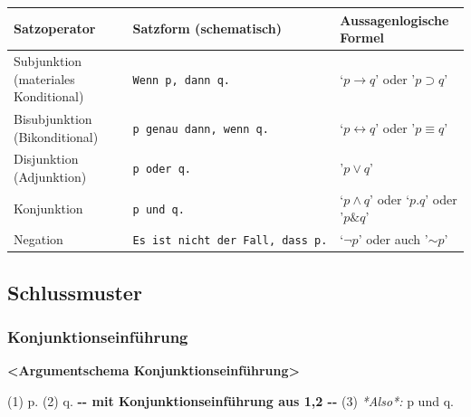 \documentclass[
  english,
  a4paper,
]{article}
\newenvironment{Shaded}{\begin{snugshade}}{\end{snugshade}}
\newcommand{\AlertTok}[1]{\textcolor[rgb]{0.02,0.51,0.79}{\textbf{#1}}}
\newcommand{\ErrorTok}[1]{\textcolor[rgb]{0.02,0.51,0.79}{#1}}
\newcommand{\FloatTok}[1]{\textcolor[rgb]{0.12,0.11,0.11}{\textit{#1}}}
\newcommand{\NormalTok}[1]{\textcolor[rgb]{0.12,0.11,0.11}{#1}}
\newcommand{\WarningTok}[1]{\textcolor[rgb]{0.46,0.73,0.89}{\textbf{#1}}}
\newcounter{none} %
\renewenvironment{Shaded}{\centering \begin{mdframed}[style=codedefault]}{\end{mdframed}}%
\newenvironment{Shaded}{\centering \begin{mdframed}[style=codedefault]}{\end{mdframed}}%
\begin{document}
{\def\LTcaptype{none} %
\begin{longtable}[]{@{}
  >{\raggedright\arraybackslash}p{}
  >{\raggedright\arraybackslash}p{}
  >{\raggedright\arraybackslash}p{}@{}}
\toprule\noalign{}
\begin{minipage}[b]{\linewidth}\raggedright
Satzoperator
\end{minipage} & \begin{minipage}[b]{\linewidth}\raggedright
Satzform (schematisch)
\end{minipage} & \begin{minipage}[b]{\linewidth}\raggedright
Aussagenlogische Formel
\end{minipage} \\
\midrule\noalign{}
\endhead
\bottomrule\noalign{}
\endlastfoot
Subjunktion (materiales Konditional) &
\texttt{\textquotesingle{}Wenn\ p,\ dann\ q.\textquotesingle{}} &
`\(p\rightarrow q\)' oder '\(p\supset q\)' \\
Bisubjunktion (Bikonditional) &
\texttt{\textquotesingle{}p\ genau\ dann,\ wenn\ q.\textquotesingle{}} &
`\(p\leftrightarrow q\)' oder '\(p\equiv q\)' \\
Disjunktion (Adjunktion) &
\texttt{\textquotesingle{}p\ oder\ q.\textquotesingle{}} &
'\(p\vee q\)' \\
Konjunktion & \texttt{\textquotesingle{}p\ und\ q.\textquotesingle{}} &
`\(p\wedge q\)' oder `\(p.q\)' oder '\(p\&q\)' \\
Negation &
\texttt{\textquotesingle{}Es\ ist\ nicht\ der\ Fall,\ dass\ p.\textquotesingle{}}
& `\(\neg p\)' oder auch '\(\sim p\)' \\
\end{longtable}
}

\subsection{Schlussmuster}\label{schlussmuster}

\subsubsection{Konjunktionseinführung}\label{konjunktionseinfuxfchrung}

\begin{Shaded}
\begin{Highlighting}[]
\AlertTok{\textless{}Argumentschema Konjunktionseinführung\textgreater{}}

\ErrorTok{(1)}\NormalTok{ p.}
\ErrorTok{(2)}\NormalTok{ q.}
\WarningTok{{-}{-} mit Konjunktionseinführung aus 1,2 {-}{-}}
\ErrorTok{(3)}\FloatTok{ *Also*:}\NormalTok{ p und q.}
\end{Highlighting}
\end{Shaded}
\end{document}
